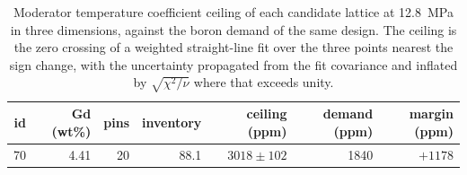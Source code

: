 \begin{table}[htbp]
  \centering
  \caption[Boron ceiling of each candidate lattice]{Moderator temperature coefficient ceiling of each candidate lattice at \SI{12.8}{MPa} in three dimensions, against the boron demand of the same design. The ceiling is the zero crossing of a weighted straight-line fit over the three points nearest the sign change, with the uncertainty propagated from the fit covariance and inflated by $\sqrt{\chi^2/\nu}$ where that exceeds unity.}
  \label{tab:c9-ceilings}
  \begin{tabular}{rrrrrrr}
    \toprule
    id & Gd (wt\%) & pins & inventory & ceiling (ppm) & demand (ppm) & margin (ppm) \\
    \midrule
    70 & 4.41 & 20 & 88.1 & $3018 \pm 102$ & 1840 & $+1178$ \\
    \bottomrule
  \end{tabular}
\end{table}

